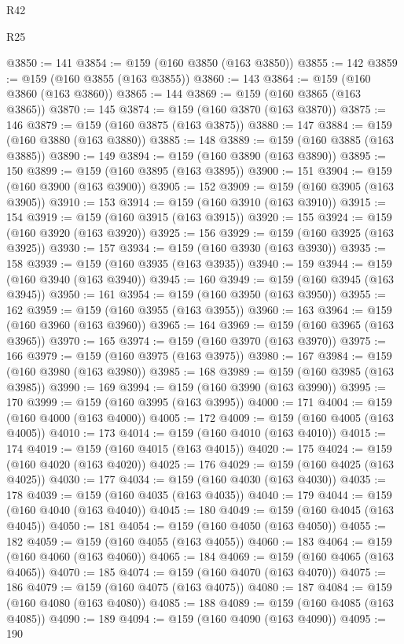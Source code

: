\begin{lexlean}{R42}
\begin{lexlean}{R25}
\begin{coremodule}
{{{{{{{{{{{{{{{{{{{{{{{{{{{{{{{{{{{{{{{{{{{{{{{{{{{{{{{{{{{{{{{{{{{{{{{{{{{{{{{{{{{{{{{{{{{{{{{{{{{{{{{{{{{{{{{{{{{{{{{{{{{{{{{{{{{{{{{{{{{{{{{{{{{{{{{{{{{{{{{{{{{{{{{{{{{{{{{{{{{{{{{{{{{{{{{{{{{{{{{@3850 := 141
@3854 := @159 (@160 @3850 (@163 @3850))
@3855 := 142
@3859 := @159 (@160 @3855 (@163 @3855))
@3860 := 143
@3864 := @159 (@160 @3860 (@163 @3860))
@3865 := 144
@3869 := @159 (@160 @3865 (@163 @3865))
@3870 := 145
@3874 := @159 (@160 @3870 (@163 @3870))
@3875 := 146
@3879 := @159 (@160 @3875 (@163 @3875))
@3880 := 147
@3884 := @159 (@160 @3880 (@163 @3880))
@3885 := 148
@3889 := @159 (@160 @3885 (@163 @3885))
@3890 := 149
@3894 := @159 (@160 @3890 (@163 @3890))
@3895 := 150
@3899 := @159 (@160 @3895 (@163 @3895))
@3900 := 151
@3904 := @159 (@160 @3900 (@163 @3900))
@3905 := 152
@3909 := @159 (@160 @3905 (@163 @3905))
@3910 := 153
@3914 := @159 (@160 @3910 (@163 @3910))
@3915 := 154
@3919 := @159 (@160 @3915 (@163 @3915))
@3920 := 155
@3924 := @159 (@160 @3920 (@163 @3920))
@3925 := 156
@3929 := @159 (@160 @3925 (@163 @3925))
@3930 := 157
@3934 := @159 (@160 @3930 (@163 @3930))
@3935 := 158
@3939 := @159 (@160 @3935 (@163 @3935))
@3940 := 159
@3944 := @159 (@160 @3940 (@163 @3940))
@3945 := 160
@3949 := @159 (@160 @3945 (@163 @3945))
@3950 := 161
@3954 := @159 (@160 @3950 (@163 @3950))
@3955 := 162
@3959 := @159 (@160 @3955 (@163 @3955))
@3960 := 163
@3964 := @159 (@160 @3960 (@163 @3960))
@3965 := 164
@3969 := @159 (@160 @3965 (@163 @3965))
@3970 := 165
@3974 := @159 (@160 @3970 (@163 @3970))
@3975 := 166
@3979 := @159 (@160 @3975 (@163 @3975))
@3980 := 167
@3984 := @159 (@160 @3980 (@163 @3980))
@3985 := 168
@3989 := @159 (@160 @3985 (@163 @3985))
@3990 := 169
@3994 := @159 (@160 @3990 (@163 @3990))
@3995 := 170
@3999 := @159 (@160 @3995 (@163 @3995))
@4000 := 171
@4004 := @159 (@160 @4000 (@163 @4000))
@4005 := 172
@4009 := @159 (@160 @4005 (@163 @4005))
@4010 := 173
@4014 := @159 (@160 @4010 (@163 @4010))
@4015 := 174
@4019 := @159 (@160 @4015 (@163 @4015))
@4020 := 175
@4024 := @159 (@160 @4020 (@163 @4020))
@4025 := 176
@4029 := @159 (@160 @4025 (@163 @4025))
@4030 := 177
@4034 := @159 (@160 @4030 (@163 @4030))
@4035 := 178
@4039 := @159 (@160 @4035 (@163 @4035))
@4040 := 179
@4044 := @159 (@160 @4040 (@163 @4040))
@4045 := 180
@4049 := @159 (@160 @4045 (@163 @4045))
@4050 := 181
@4054 := @159 (@160 @4050 (@163 @4050))
@4055 := 182
@4059 := @159 (@160 @4055 (@163 @4055))
@4060 := 183
@4064 := @159 (@160 @4060 (@163 @4060))
@4065 := 184
@4069 := @159 (@160 @4065 (@163 @4065))
@4070 := 185
@4074 := @159 (@160 @4070 (@163 @4070))
@4075 := 186
@4079 := @159 (@160 @4075 (@163 @4075))
@4080 := 187
@4084 := @159 (@160 @4080 (@163 @4080))
@4085 := 188
@4089 := @159 (@160 @4085 (@163 @4085))
@4090 := 189
@4094 := @159 (@160 @4090 (@163 @4090))
@4095 := 190
}}}}}}}}}}}}}}}}}}}}}}}}}}}}}}}}}}}}}}}}}}}}}}}}}}}}}}}}}}}}}}}}}}}}}}}}}}}}}}}}}}}}}}}}}}}}}}}}}}}}}}}}}}}}}}}}}}}}}}}}}}}}}}}}}}}}}}}}}}}}}}}}}}}}}}}}}}}}}}}}}}}}}}}}}}}}}}}}}}}}}}}}}}}}}}}}}}}}}}}
\end{coremodule}
\end{lexlean}
\end{lexlean}
